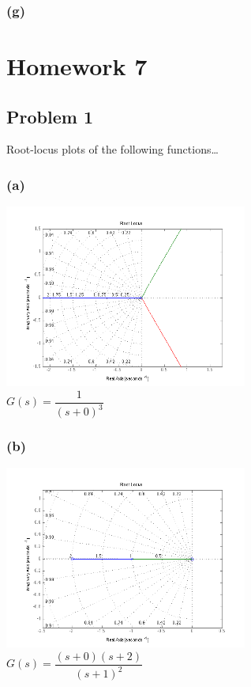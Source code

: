 \documentclass[letterpaper,10pt]{article}
\begin{document}
\subsubsection*{(g)}

\section*{Homework 7}
\subsection*{Problem 1}
Root-locus plots of the following functions\dots
\subsubsection*{(a)}
\begin{center}
    \includegraphics[width=0.6\textwidth]{homework04-7-1-a.png} \\
   $G(s) = \dfrac{1}{(s+0)^{3}}$
\end{center}
\subsubsection*{(b)}
\begin{center}
    \includegraphics[width=0.6\textwidth]{homework04-7-1-b.png} \\
   $G(s) = \dfrac{(s+0)(s+2)}{(s+1)^{2}}$
\end{center}
\end{document}
